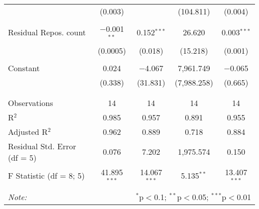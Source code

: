 \begin{tabular}{@{\extracolsep{5pt}}lcccc}
  & (0.003) &  & (104.811) & (0.004) \\
  & & & & \\
 Residual Repos. count & $-$0.001$^{**}$ & 0.152$^{***}$ & 26.620 & 0.003$^{***}$ \\
  & (0.0005) & (0.018) & (15.218) & (0.001) \\
  & & & & \\
 Constant & 0.024 & $-$4.067 & 7,961.749 & $-$0.065 \\
  & (0.338) & (31.831) & (7,988.258) & (0.665) \\
  & & & & \\
\hline \\[-1.8ex]
Observations & 14 & 14 & 14 & 14 \\
R$^{2}$ & 0.985 & 0.957 & 0.891 & 0.955 \\
Adjusted R$^{2}$ & 0.962 & 0.889 & 0.718 & 0.884 \\
Residual Std. Error (df = 5) & 0.076 & 7.202 & 1,975.574 & 0.150 \\
F Statistic (df = 8; 5) & 41.895$^{***}$ & 14.067$^{***}$ & 5.135$^{**}$ & 13.407$^{***}$ \\
\hline
\hline \\[-1.8ex]
\textit{Note:}  & \multicolumn{4}{r}{$^{*}$p$<$0.1; $^{**}$p$<$0.05; $^{***}$p$<$0.01} \\
\end{tabular}
